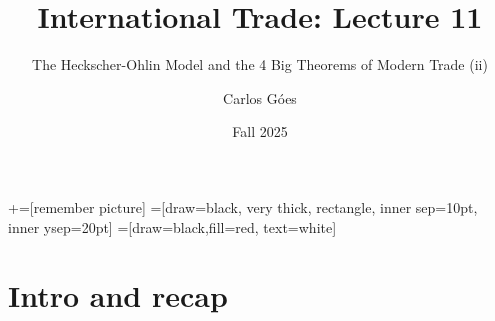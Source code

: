 \documentclass[notes,11pt, aspectratio=169, xcolor=table]{beamer}
\title[]{International Trade: Lecture 11}
\subtitle[]{The Heckscher-Ohlin Model and the 4 Big Theorems of Modern Trade (ii)}
\author[Góes]
{Carlos Góes\inst{1}}
\date{Fall 2025}
\institute[GWU]{\inst{1} George Washington University }
\begin{document}
\newcommand\marktopleft[1]{%
    \tikz[overlay,remember picture] 
        \node (marker-#1-a) at (-.3em,.3em) {};%
}
\newcommand\markbottomright[2]{%
    \tikz[overlay,remember picture] 
        \node (marker-#1-b) at (0em,0em) {};%
}
+=[remember picture] 
 =[draw=black, very thick, rectangle, inner sep=10pt, inner ysep=20pt]
 =[draw=black,fill=red, text=white]















\frame{\titlepage}
\addtocounter{framenumber}{-1}




\section{Intro and recap}
\end{document}
